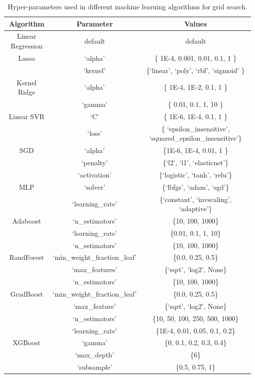\documentclass[10pt,aps,prb,amsmath,amssymb,twocolumn,letterpaper,nobalancelastpage,final,citeautoscript,floatfix,raggedbottom,superscriptaddress]{revtex4-1}
\begin{document}
\begin{table}
\begin{ruledtabular}
\caption{Hyper-parameters used in different machine learning algorithms for grid search.\label{tab:hyperparam}}
\centering
\begin{tabular}{ccc}
\sffamily Algorithm & \sffamily Parameter & \sffamily Values \\
\hline
Linear Regression & default & default \\
\hline
Lasso & `alpha' & \{ 1E-4, 0.001, 0.01, 0.1, 1 \}\\
\hline
& `kernel' & \{`linear', `poly', `rbf', `sigmoid' \} \\
Kernel Ridge & `alpha' & \{ 1E-4, 1E-2, 0.1, 1 \} \\
& `gamma' & \{ 0.01, 0.1, 1, 10 \} \\
\hline
Linear SVR & `C' & \{ 1E-6, 1E-4, 0.1, 1 \} \\
& `loss' & \{ `epsilon\_insensitive', `squared\_epsilon\_insensitive'\} \\
\hline
SGD & `alpha' & \{1E-6, 1E-4, 0.01, 1 \} \\
& `penalty' & \{`l2', `l1', `elasticnet'\} \\
\hline
& `activation' & \{`logistic', `tanh', `relu'\} \\
MLP & `solver' & \{`lbfgs', `adam', `sgd'\} \\
& `learning\_rate' & \{`constant', `invscaling', `adaptive'\} \\
\hline
Adaboost & `n\_estimators' & \{10, 100, 1000\} \\
& `learning\_rate' & \{0.01, 0.1, 1, 10\} \\
\hline
& `n\_estimators' & \{10, 100, 1000\} \\
RandForest& `min\_weight\_fraction\_leaf' & \{0.0, 0.25, 0.5\} \\
& `max\_features' & \{`sqrt', `log2', None\} \\
\hline
& `n\_estimators' &  \{10, 100, 1000\}\\
GradBoost & `min\_weight\_fraction\_leaf' &  \{0.0, 0.25, 0.5\}\\
& `max\_feature' &  \{`sqrt', `log2', None\}\\
\hline
& `n\_estimators' &  \{10, 50, 100, 250, 500, 1000\}\\
& `learning\_rate' &  \{1E-4, 0.01, 0.05, 0.1, 0.2\}\\
XGBoost & `gamma' &  \{0, 0.1, 0.2, 0.3, 0.4\}\\
& `max\_depth' &  \{6\}\\
& `subsample' &  \{0.5, 0.75, 1\}\\
\end{tabular}
\end{ruledtabular}
\end{table}
\end{document}
